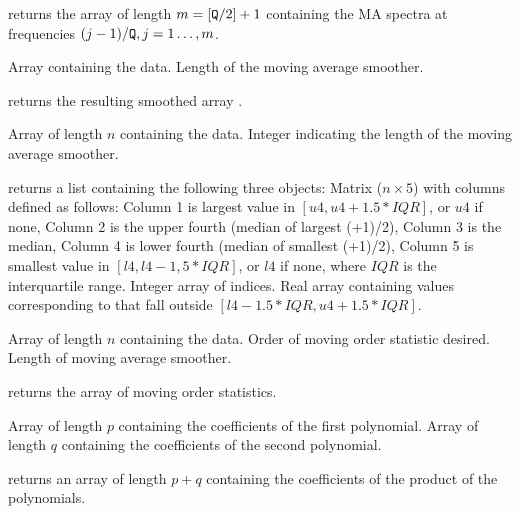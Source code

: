 \Sval
\Sitem{ }  returns the array {} of length 
$m = [{\tt{Q}}/2]+1$ containing the MA spectra at frequencies 
$(j-1)/{\tt{Q}},j=1\ldots,m$. 
%
%


\Sarg
{} Array containing the data.
 Length of the moving average smoother.

\Sval
\Sitem{ }  returns the resulting smoothed array {}.
%
%


\Sarg
{} Array of length $n$ containing the data.
 Integer indicating the length of the moving average smoother.

\Sval
\Sitem{ }  returns a list containing the following 
three objects:
 Matrix ($n\times 5$) with columns defined as follows:
\Sitem{ } Column 1 is largest value in $[u4, u4 + 1.5*IQR]$,
          or $u4$ if none,
\Sitem{ } Column 2 is the upper fourth (median of largest 
          ({}+1)/2),
\Sitem{ } Column 3 is the median,
\Sitem{ } Column 4 is lower fourth (median of smallest
          ({}+1)/2),
\Sitem{ } Column 5 is smallest value in $[l4, l4 - 1,5*IQR]$,
          or $l4$ if none,
\Sitem{ } where $IQR$ is the interquartile range.
 Integer array of indices.
 Real array containing values corresponding to {} 
that fall outside $[l4 - 1.5*IQR, u4 + 1.5*IQR]$. 
%
%


\Sarg
{} Array of length $n$ containing the data.
 Order of moving order statistic desired.
 Length of moving average smoother.

\Sval
\Sitem{ }  returns the array of moving order 
statistics.
%
%


\Sarg
{} Array of length $p$ containing the coefficients of the first 
polynomial.
 Array of length $q$ containing the coefficients of the second 
polynomial.

\Sval
\Sitem{ }  returns an array of length $p+q$ 
containing the coefficients of the product of the polynomials.
%
%

